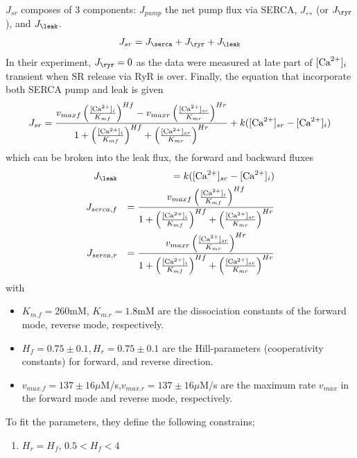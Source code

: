 $J_{sr}$ composes of 3 components: $J_{pump}$ the net pump flux via
SERCA, $J_\rel$ (or $J_\ryr$), and $J_\leak$.
\begin{equation}
  \label{eq:984}
  J_{sr} = J_\serca + J_\ryr + J_\leak
\end{equation}
In their experiment, $J_\ryr=0$ as the data were measured at late part
of $[{\text{Ca}^{2+}}]_i$ transient when SR release via RyR is over. Finally, the
equation that incorporate both SERCA pump and leak is given
\begin{equation}
  \label{eq:985}
  J_{sr} = \frac{v_{maxf}\left( \frac{[{\text{Ca}^{2+}}]_i}{K_{mf}} \right)^{Hf} -
    v_{maxr}\left( \frac{[{\text{Ca}^{2+}}]_{sr}}{K_{mr}} \right)^{Hr}  }{1+ \left(
      \frac{[{\text{Ca}^{2+}}]_{i}}{K_{mf}} \right)^{Hf} + \left( \frac{[{\text{Ca}^{2+}}]_{sr}}{K_{mr}} \right)^{Hr}} +
  k([{\text{Ca}^{2+}}]_{sr} - [{\text{Ca}^{2+}}]_i)
\end{equation}
which can be broken into the leak flux, the forward and backward
fluxes
\begin{eqnarray}
  \label{eq:986}
  J_\leak &&=   k([\Ca]_{sr} - [\Ca]_i)\\
  J_{serca,f} &&= 
  \frac{v_{maxf}\left( \frac{[\Ca]_i}{K_{mf}} \right)^{Hf}  }{1+ \left(
      \frac{[\Ca]_{i}}{K_{mf}} \right)^{Hf} + \left(
      \frac{[\Ca]_{sr}}{K_{mr}} \right)^{Hr}}  \\
  J_{serca,r} &&= 
  \frac{
    v_{maxr}\left( \frac{[\Ca]_{sr}}{K_{mr}} \right)^{Hr}  }{1+ \left(
      \frac{[\Ca]_{i}}{K_{mf}} \right)^{Hf} + \left(
      \frac{[\Ca]_{sr}}{K_{mr}} \right)^{Hr}}  
\end{eqnarray}
with
\begin{itemize}
\item $K_{m.f}=260$mM, $K_{m.r}=1.8$mM are the dissociation constants
  of the forward mode, reverse mode, respectively.


\item $H_{f}=0.75\pm0.1,H_{r}=0.75\pm0.1$ are the Hill-parameters
  (cooperativity constants) for forward, and reverse direction.

\item $v_{max.f}=137\pm16\mu$M/s,$v_{max.r}=137\pm16\mu$M/s are the
  maximum rate $v_{max}$ in the forward mode and reverse mode,
  respectively.
\end{itemize}


To fit the parameters, they define the following constrains;
\begin{enumerate}
\item  $H_r=H_f$, $0.5<H_f<4$
\end{enumerate}


